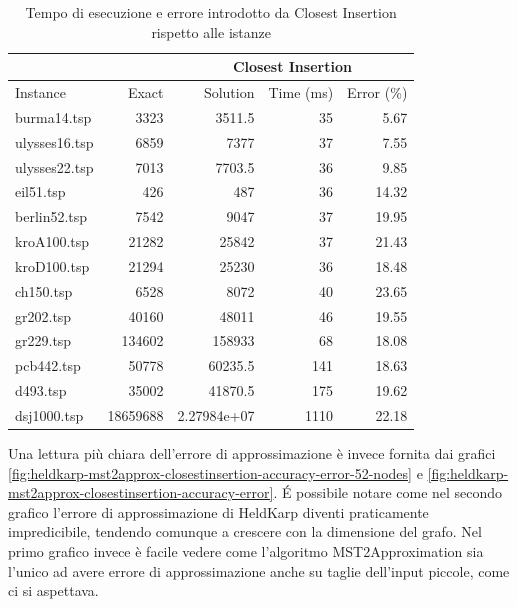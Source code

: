\begin{table}[h]
    \centering

    \begin{tabular}{lrrrr}
    \toprule
    \multicolumn{2}{c}{ } & \multicolumn{3}{c}{Closest Insertion} \\
    \hline
    Instance & Exact & Solution &   Time (ms) &   Error (\%) \\
    \hline
    burma14.tsp   &     3323 &   3511.5         &          35 &        5.67 \\
    ulysses16.tsp &     6859 &   7377           &          37 &        7.55 \\
    ulysses22.tsp &     7013 &   7703.5         &          36 &        9.85 \\
    eil51.tsp     &      426 &    487           &          36 &       14.32 \\
    berlin52.tsp  &     7542 &   9047           &          37 &       19.95 \\
    kroA100.tsp   &    21282 &  25842           &          37 &       21.43 \\
    kroD100.tsp   &    21294 &  25230           &          36 &       18.48 \\
    ch150.tsp     &     6528 &   8072           &          40 &       23.65 \\
    gr202.tsp     &    40160 &  48011           &          46 &       19.55 \\
    gr229.tsp     &   134602 & 158933           &          68 &       18.08 \\
    pcb442.tsp    &    50778 &  60235.5         &         141 &       18.63 \\
    d493.tsp      &    35002 &  41870.5         &         175 &       19.62 \\
    dsj1000.tsp   & 18659688 &      2.27984e+07 &        1110 &       22.18 \\
    \bottomrule
    \end{tabular}

    \caption{Tempo di esecuzione e errore introdotto da Closest Insertion rispetto alle istanze}
    \label{table:closest-insertion-runtime-accuracy}
\end{table}

\noindent Una lettura più chiara dell'errore di approssimazione è invece
fornita dai grafici
\ref{fig:heldkarp-mst2approx-closestinsertion-accuracy-error-52-nodes}
 e \ref{fig:heldkarp-mst2approx-closestinsertion-accuracy-error}.
\'E possibile notare come nel
secondo grafico l'errore di approssimazione di HeldKarp diventi
praticamente impredicibile, tendendo comunque a crescere con la
dimensione del grafo. Nel primo grafico invece è facile vedere
come l'algoritmo MST2Approximation sia l'unico ad avere errore
di approssimazione anche su taglie dell'input piccole,
come ci si aspettava.

